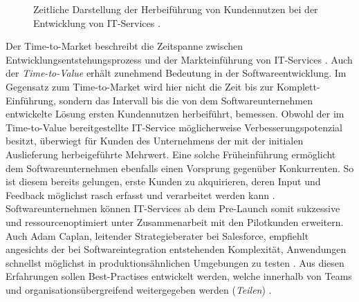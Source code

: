 \begin{center}
	\begin{figure}[H]
		\centering
		\caption[Zeitliche Darstellung der Herbeiführung von Kundennutzen bei der Entwicklung von IT-Services]{Zeitliche Darstellung der Herbeiführung von Kundennutzen bei der Entwicklung von IT-Services \cite[9]{Halstenberg.2020}.}
		\label{fig:TTM}
	\end{figure}
\end{center}
\vspace*{-15mm}
Der Time-to-Market beschreibt die Zeitspanne zwischen Entwicklungsentstehungsprozess und der Markteinführung von IT-Services \cite[141]{Vesey.1992}. Auch der \textit{Time-to-Value} erhält zunehmend Bedeutung in der Softwareentwicklung. Im Gegensatz zum Time-to-Market wird hier nicht die Zeit bis zur Komplett-Einführung, sondern das Intervall bis die von dem Softwareunternehmen entwickelte Lösung ersten Kundennutzen herbeiführt, bemessen. Obwohl der im Time-to-Value bereitgestellte IT-Service möglicherweise Verbesserungspotenzial besitzt, überwiegt für Kunden des Unternehmens der mit der initialen Auslieferung herbeigeführte Mehrwert. Eine solche Früheinführung ermöglicht dem Softwareunternehmen ebenfalls einen Vorsprung gegenüber Konkurrenten. So ist diesem bereits gelungen, erste Kunden zu akquirieren, deren Input und Feedback möglichst rasch erfasst und verarbeitet werden kann \cite[9]{Halstenberg.2020}. Softwareunternehmen können IT-Services ab dem Pre-Launch somit sukzessive und ressourcenoptimiert unter Zusammenarbeit mit den Pilotkunden erweitern. Auch Adam Caplan, leitender Strategieberater bei Salesforce, empfiehlt angesichts der bei Softwareintegration entstehenden Komplexität, Anwendungen schnellst möglichst in produktionsähnlichen Umgebungen zu testen \cite{Vesey.1992}. Aus diesen Erfahrungen sollen Best-Practises entwickelt werden, welche innerhalb von Teams und organisationsübergreifend weitergegeben werden (\textit{Teilen}) \cite[7]{Halstenberg.2020}. 

